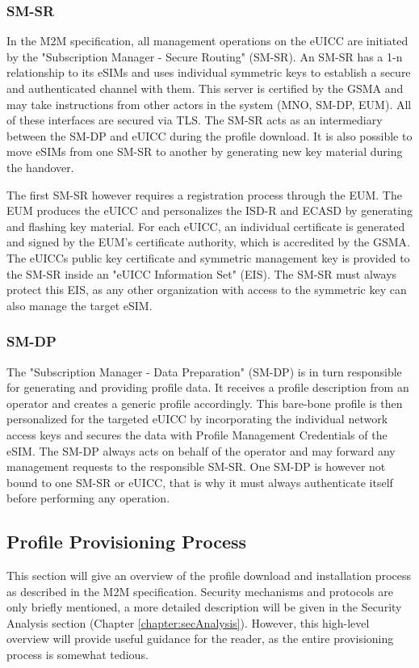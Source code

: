 \subsubsection{SM-SR}
In the M2M specification, all management operations on the eUICC are initiated by the "Subscription Manager - Secure Routing" (SM-SR). An SM-SR has a 1-n relationship to its eSIMs and uses individual symmetric keys to establish a secure and authenticated channel with them. This server is certified by the GSMA and may take instructions from other actors in the system (MNO, SM-DP, EUM). All of these interfaces are secured via TLS. The SM-SR acts as an intermediary between the SM-DP and eUICC during the profile download. It is also possible to move eSIMs from one SM-SR to another by generating new key material during the handover. 

The first SM-SR however requires a registration process through the EUM. The EUM produces the eUICC and personalizes the ISD-R and ECASD by generating and flashing key material. For each eUICC, an individual certificate is generated and signed by the EUM's certificate authority, which is accredited by the GSMA. The eUICCs public key certificate and symmetric management key is provided to the SM-SR inside an "eUICC Information Set" (EIS). The SM-SR must always protect this EIS, as any other organization with access to the symmetric key can also manage the target eSIM.  

\subsubsection{SM-DP}
The "Subscription Manager - Data Preparation" (SM-DP) is in turn responsible for generating and providing profile data. It receives a profile description from an operator and creates a generic profile accordingly. This bare-bone profile is then personalized for the targeted eUICC by incorporating the individual network access keys and secures the data with Profile Management Credentials of the eSIM.
The SM-DP always acts on behalf of the operator and may forward any management requests to the responsible SM-SR. One SM-DP is however not bound to one SM-SR or eUICC, that is why it must always authenticate itself before performing any operation. 

\subsection{Profile Provisioning Process} \label{sec:M2MProfile}
This section will give an overview of the profile download and installation process as described in the M2M specification. Security mechanisms and protocols are only briefly mentioned, a more detailed description will be given in the Security Analysis section (Chapter \ref{chapter:secAnalysis}). However, this high-level overview will provide useful guidance for the reader, as the entire provisioning process is somewhat tedious. 

